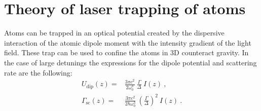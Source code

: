 
\chapter{\label{chap:dipole}Theory of laser trapping of atoms}


\ifpdf{}
    \graphicspath{{Chapter1/Figs/Raster/}{Chapter1/Figs/PDF/}{Chapter1/Figs/}}
\else
    \graphicspath{{Chapter1/Figs/Vector/}{Chapter1/Figs/}}
\fi

Atoms can be trapped in an optical potential created by the dispersive interaction 
of the atomic dipole moment with the intensity gradient of the light field. These 
trap can be used to confine the atoms in 3D counteract gravity. In the case of 
large detunings the expressions for the dipole potential and scattering rate\cite{grimm} 
are the following:
%
\begin{align}
    U_\mathrm{dip}(z) =& \frac{3\pi c^2}{2\omega_0^3}~\frac{\Gamma}{\Delta}~I(z)~, \label{eq:dipolepot_simple}\\
    \Gamma_{\mathrm{sc}}(z) =& \frac{3\pi c^2}{2\hbar\omega_0^3}~
    {\left ( \frac{\Gamma}{\Delta} \right )}^2~I(z)~.\label{eq:scattering_simple}
\end{align}


